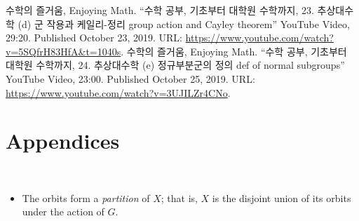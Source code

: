 \documentclass[11pt,openany]{article}
\begin{document}
\vfill
\begin{thebibliography}{9}
	수학의 즐거움, Enjoying Math. ``수학 공부, 기초부터 대학원 수학까지, 23. 추상대수학 (d) 군 작용과 케일리-정리 group action and Cayley theorem'' YouTube Video, 29:20. Published 
	October 23, 2019. URL: \url{https://www.youtube.com/watch?v=5SQfrH83HfA&t=1040s}.
	수학의 즐거움, Enjoying Math. ``수학 공부, 기초부터 대학원 수학까지, 24. 추상대수학 (e) 정규부분군의 정의 def of normal subgroups'' YouTube Video, 23:00. Published 
	October 25, 2019. URL: \url{https://www.youtube.com/watch?v=3UJILZr4CNo}.
\end{thebibliography}

\newpage

\appendix
\section*{Appendices}
\begin{remark*}
	\ \begin{itemize}
		\item The orbits form a \emph{partition} of \( X \); that is, \( X \) is the disjoint union of its orbits under the action of \( G \).
	\end{itemize}
%
\end{remark*}
\end{document}

